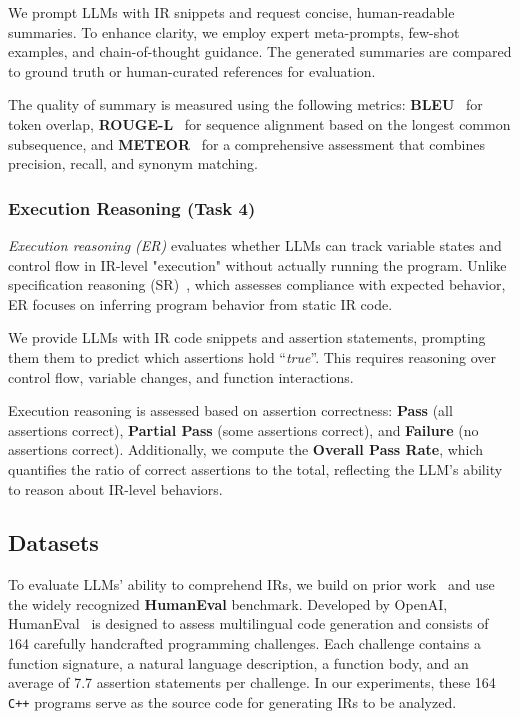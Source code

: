 We prompt LLMs with IR snippets and request concise, human-readable summaries. To enhance clarity, we employ expert meta-prompts, few-shot examples, and chain-of-thought guidance. The generated summaries are compared to ground truth or human-curated references for evaluation.


The quality of summary is measured using the following metrics: \textbf{BLEU}~\cite{bleu} for token overlap, \textbf{ROUGE-L}~\cite{rouge} for sequence alignment based on the longest common subsequence, and \textbf{METEOR}~\cite{meteor} for a comprehensive assessment that combines precision, recall, and synonym matching.

\subsubsection{Execution Reasoning  (Task 4)}
\textit{Execution reasoning (ER)} evaluates whether LLMs can track variable states and control flow in IR-level "execution" without actually running the program. Unlike specification reasoning (SR)~\cite{min2023beyond,deshpande2021rect,wu2023reasoning}, which assesses compliance with expected behavior, ER focuses on inferring program behavior from static IR code.


We provide LLMs with IR code snippets and assertion statements, prompting them them to predict which assertions hold ``\textit{true}''. This requires reasoning over control flow, variable changes, and function interactions.

Execution reasoning is assessed based on assertion correctness: \textbf{Pass} (all assertions correct), \textbf{Partial Pass} (some assertions correct), and \textbf{Failure} (no assertions correct). Additionally, we compute the \textbf{Overall Pass Rate}, which quantifies the ratio of correct assertions to the total, reflecting the LLM's ability to reason about IR-level behaviors.

\subsection{Datasets}
To evaluate LLMs’ ability to comprehend IRs, we build on prior work~\cite{zheng2023codegeex, tan2024llm4decompile} and use the widely recognized \textbf{HumanEval} benchmark. Developed by OpenAI, HumanEval~\cite{HuamanEval2021} is designed to assess multilingual code generation and consists of 164 carefully handcrafted programming challenges. Each challenge contains a function signature, a natural language description, a function body, and an average of 7.7 assertion statements per challenge. In our experiments, these 164 \texttt{C++} programs serve as the source code for generating IRs to be analyzed.



